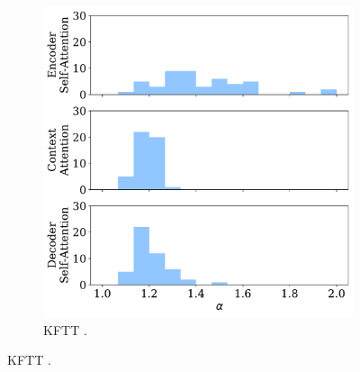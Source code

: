 \begin{figure}[!htbp]
\begin{subfigure}[b]{.49\linewidth}
        \includegraphics[width=\linewidth]{Figures/hist_alphas_ja.pdf}
        \caption{%
            \label{fig:hist_alphas_ja}%
            KFTT .}
    \end{subfigure}


\end{figure}
